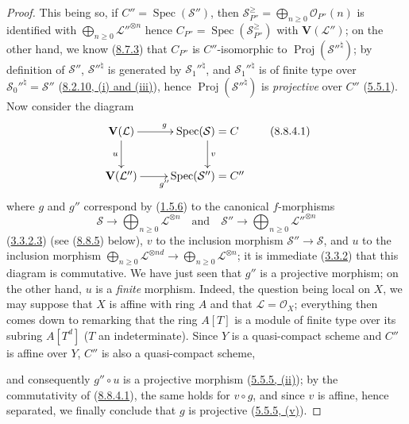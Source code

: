 \begin{proof}
This being so, if $C''=\operatorname{Spec}(\mathcal{S}'')$, then
$\mathcal{S}_{P''}^{\geqslant}=
\bigoplus_{n\geqslant 0}\mathcal{O}_{P''}(n)$ is identified with
$\bigoplus_{n\geqslant 0}\mathcal{L}''^{\otimes n}$ hence
$C_{P''}=\operatorname{Spec}(\mathcal{S}_{P''}^{\geqslant})$ with
$\mathbf{V}(\mathcal{L}'')$; on the other hand, we know
(\hyperref[II.8.7.3]{8.7.3}) that $C_{P''}$ is $C''$-isomorphic to
$\operatorname{Proj}(\mathcal{S}''^{\natural})$; by definition of
$\mathcal{S}''$, $\mathcal{S}''^{\natural}$ is generated by
$\mathcal{S}_1''^{\natural}$, and $\mathcal{S}_1''^{\natural}$ is of finite type
over $\mathcal{S}_0''^{\natural}=\mathcal{S}''$
(\hyperref[II.8.2.10]{8.2.10, (i) and (iii)}), hence
$\operatorname{Proj}(\mathcal{S}''^{\natural})$ is \emph{projective} over
$C''$ (\hyperref[II.5.5.1]{5.5.1}). Now consider the diagram
\begin{equation}
\label{II.8.8.4.1}
  \xymatrix{
    \mathbf{V}(\mathcal{L})\ar[r]^{g}\ar[d]_{u} &
    \operatorname{Spec}(\mathcal{S})=C\ar[d]^{v}\\
    \mathbf{V}(\mathcal{L}'')\ar[r]_{g''} &
    \operatorname{Spec}(\mathcal{S}'')=C''
  }
\tag{8.8.4.1}
\end{equation}
where $g$ and $g''$ correspond by (\hyperref[II.1.5.6]{1.5.6}) to the
canonical $f$-morphisms
\[
  \mathcal{S}\longrightarrow
  \bigoplus_{n\geqslant 0}\mathcal{L}^{\otimes n}
  \quad\text{and}\quad
  \mathcal{S}''\longrightarrow
  \bigoplus_{n\geqslant 0}\mathcal{L}''^{\otimes n}
\]
(\hyperref[II.3.3.2.3]{3.3.2.3}) (see
(\hyperref[II.8.8.5]{8.8.5}) below), $v$ to the inclusion morphism
$\mathcal{S}''\to\mathcal{S}$, and $u$ to the inclusion morphism
$\bigoplus_{n\geqslant 0}\mathcal{L}^{\otimes nd}\to
\bigoplus_{n\geqslant 0}\mathcal{L}^{\otimes n}$; it is immediate
(\hyperref[II.3.3.2]{3.3.2}) that this diagram is commutative. We have
just seen that $g''$ is a projective morphism; on the other hand, $u$ is a
\emph{finite} morphism. Indeed, the question being local on $X$, we may
suppose that $X$ is affine with ring $A$ and that $\mathcal{L}=\mathcal{O}_X$;
everything then comes down to remarking that the ring $A[T]$ is a module of
finite type over its subring $A[T^d]$ ($T$ an indeterminate). Since $Y$ is a
quasi-compact scheme and $C''$ is affine over $Y$, $C''$ is also a
quasi-compact scheme,

and consequently $g''\circ u$ is a projective morphism
(\hyperref[II.5.5.5]{5.5.5, (ii)}); by the commutativity of
(\hyperref[II.8.8.4.1]{8.8.4.1}), the same holds for $v\circ g$, and since
$v$ is affine, hence separated, we finally conclude that $g$ is projective
(\hyperref[II.5.5.5]{5.5.5, (v)}).
\end{proof}

